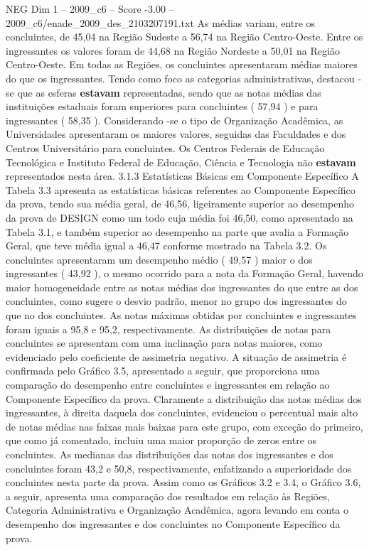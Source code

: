 \begin{textsample}{NEG Dim 1 – 2009\_c6 – Score -3.00 – 2009\_c6/enade\_2009\_des\_2103207191.txt}
As médias variam, entre os concluintes, de 45,04 na Região Sudeste a 56,74 na Região Centro-Oeste.
Entre os ingressantes os valores foram de 44,68 na Região Nordeste a 50,01 na Região Centro-Oeste.
Em todas as Regiões, os concluintes apresentaram médias maiores do que os ingressantes.
Tendo como foco as categorias administrativas, destacou -se que as esferas \textbf{estavam} representadas, sendo que as notas médias das instituições estaduais foram superiores para concluintes ( 57,94 ) e para ingressantes ( 58,35 ).
Considerando -se o tipo de Organização Acadêmica, as Universidades apresentaram os maiores valores, seguidas das Faculdades e dos Centros Universitário para concluintes.
Os Centros Federais de Educação Tecnológica e Instituto Federal de Educação, Ciência e Tecnologia não \textbf{estavam} representados nesta área. 3.1.3 Estatísticas Básicas em Componente Específico A Tabela 3.3 apresenta as estatísticas básicas referentes ao Componente Específico da prova, tendo sua média geral, de 46,56, ligeiramente superior ao desempenho da prova de DESIGN como um todo cuja média foi 46,50, como apresentado na Tabela 3.1, e também superior ao desempenho na parte que avalia a Formação Geral, que teve média igual a 46,47 conforme mostrado na Tabela 3.2.
Os concluintes apresentaram um desempenho médio ( 49,57 ) maior o dos ingressantes ( 43,92 ), o mesmo ocorrido para a nota da Formação Geral, havendo maior homogeneidade entre as notas médias dos ingressantes do que entre as dos concluintes, como sugere o desvio padrão, menor no grupo dos ingressantes do que no dos concluintes.
As notas máximas obtidas por concluintes e ingressantes foram iguais a 95,8 e 95,2, respectivamente.
As distribuições de notas para concluintes se apresentam com uma inclinação para notas maiores, como evidenciado pelo coeficiente de assimetria negativo.
A situação de assimetria é confirmada pelo Gráfico 3.5, apresentado a seguir, que proporciona uma comparação do desempenho entre concluintes e ingressantes em relação ao Componente Específico da prova.
Claramente a distribuição das notas médias dos ingressantes, à direita daquela dos concluintes, evidenciou o percentual mais alto de notas médias nas faixas mais baixas para este grupo, com exceção do primeiro, que como já comentado, incluiu uma maior proporção de zeros entre os concluintes.
As medianas das distribuições das notas dos ingressantes e dos concluintes foram 43,2 e 50,8, respectivamente, enfatizando a superioridade dos concluintes nesta parte da prova.
Assim como os Gráficos 3.2 e 3.4, o Gráfico 3.6, a seguir, apresenta uma comparação dos resultados em relação às Regiões, Categoria Administrativa e Organização Acadêmica, agora levando em conta o desempenho dos ingressantes e dos concluintes no Componente Específico da prova.

\end{textsample}

